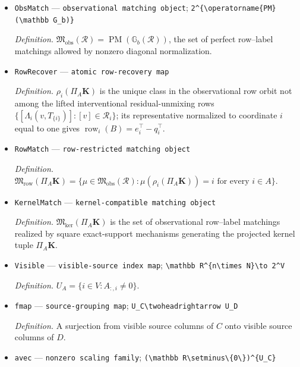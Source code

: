 \documentclass{article}
\begin{document}
\begin{itemize}
  \item \texttt{ObsMatch} --- \texttt{observational matching object}; \texttt{2\textasciicircum{}\{\textbackslash{}\allowbreak{}operatorname\{PM\}\allowbreak{}(\textbackslash{}\allowbreak{}mathbb G\_\allowbreak{}b)\}\allowbreak{}}
  \par\smallskip\noindent\emph{Definition.} \(\mathfrak M_{\mathrm{obs}}(\mathscr R)=\operatorname{PM}(\mathbb G_b(\mathscr R))\), the set of perfect row--label matchings allowed by nonzero diagonal normalization.
  \item \texttt{RowRecover} --- \texttt{atomic row-\allowbreak{}recovery map}
  \par\smallskip\noindent\emph{Definition.} \(\rho_i(\Pi_A\mathbf K)\) is the unique class in the observational row orbit not among the lifted interventional residual-unmixing rows \(\{[\Lambda_i(v,T_{\{i\}})]:[v]\in\mathscr R_i\}\); its representative normalized to coordinate \(i\) equal to one gives \(\operatorname{row}_i(B)=e_i^\top-q_i^\top\).
  \item \texttt{RowMatch} --- \texttt{row-\allowbreak{}restricted matching object}
  \par\smallskip\noindent\emph{Definition.} \(\mathfrak M_{\mathrm{row}}(\Pi_A\mathbf K)=\{\mu\in\mathfrak M_{\mathrm{obs}}(\mathscr R):\mu(\rho_i(\Pi_A\mathbf K))=i\text{ for every }i\in A\}\).
  \item \texttt{KernelMatch} --- \texttt{kernel-\allowbreak{}compatible matching object}
  \par\smallskip\noindent\emph{Definition.} \(\mathfrak M_{\mathrm{ker}}(\Pi_A\mathbf K)\) is the set of observational row--label matchings realized by square exact-support mechanisms generating the projected kernel tuple \(\Pi_A\mathbf K\).
  \item \texttt{Visible} --- \texttt{visible-\allowbreak{}source index map}; \texttt{\textbackslash{}\allowbreak{}mathbb R\textasciicircum{}\{n\textbackslash{}\allowbreak{}times N\}\allowbreak{}\textbackslash{}\allowbreak{}to 2\textasciicircum{}V}
  \par\smallskip\noindent\emph{Definition.} \(U_A=\{i\in V:A_{:,i}\ne0\}\).
  \item \texttt{fmap} --- \texttt{source-\allowbreak{}grouping map}; \texttt{U\_\allowbreak{}C\textbackslash{}\allowbreak{}twoheadrightarrow U\_\allowbreak{}D}
  \par\smallskip\noindent\emph{Definition.} A surjection from visible source columns of \(C\) onto visible source columns of \(D\).
  \item \texttt{avec} --- \texttt{nonzero scaling family}; \texttt{(\textbackslash{}\allowbreak{}mathbb R\textbackslash{}\allowbreak{}setminus\textbackslash{}\allowbreak{}\{0\textbackslash{}\allowbreak{}\}\allowbreak{})\textasciicircum{}\{U\_\allowbreak{}C\}\allowbreak{}}

\end{itemize}
\end{document}
